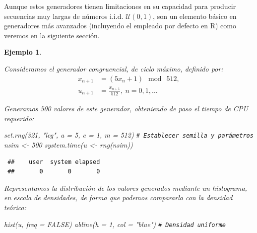 \documentclass[
  10pt,
]{book}
\newenvironment{Shaded}{\begin{snugshade}}{\end{snugshade}}
\newcommand{\AttributeTok}[1]{\textcolor[rgb]{0.77,0.63,0.00}{#1}}
\newcommand{\CommentTok}[1]{\textcolor[rgb]{0.56,0.35,0.01}{\textit{#1}}}
\newcommand{\ConstantTok}[1]{\textcolor[rgb]{0.00,0.00,0.00}{#1}}
\newcommand{\DecValTok}[1]{\textcolor[rgb]{0.00,0.00,0.81}{#1}}
\newcommand{\FunctionTok}[1]{\textcolor[rgb]{0.00,0.00,0.00}{#1}}
\newcommand{\NormalTok}[1]{#1}
\newcommand{\OtherTok}[1]{\textcolor[rgb]{0.56,0.35,0.01}{#1}}
\newcommand{\StringTok}[1]{\textcolor[rgb]{0.31,0.60,0.02}{#1}}
\theoremstyle{break}
\newtheorem{example}{Ejemplo}[chapter]
\theoremstyle{nonumberplain}
\renewcommand{\CommentTok}[1]{\textcolor[rgb]{0.41,0.41,0.41}{\texttt{#1}}}
\begin{document}
Aunque estos generadores tienen limitaciones en su capacidad para producir secuencias muy largas de números i.i.d. \(\mathcal{U}(0,1)\), son un elemento básico en generadores más avanzados (incluyendo el empleado por defecto en R) como veremos en la siguiente sección.

\begin{example}
\protect\hypertarget{exm:congru512}{}\label{exm:congru512}

Consideramos el generador congruencial, de ciclo máximo, definido por:
\[\begin{aligned}
x_{n+1}  & =(5x_{n}+1)\ \bmod\ 512,\nonumber\\
u_{n+1}  & =\frac{x_{n+1}}{512},\ n=0,1,\dots\nonumber
\end{aligned}\]

Generamos 500 valores de este generador, obteniendo de paso el tiempo de CPU requerido:

\begin{Shaded}
\begin{Highlighting}[]
\FunctionTok{set.rng}\NormalTok{(}\DecValTok{321}\NormalTok{, }\StringTok{"lcg"}\NormalTok{, }\AttributeTok{a =} \DecValTok{5}\NormalTok{, }\AttributeTok{c =} \DecValTok{1}\NormalTok{, }\AttributeTok{m =} \DecValTok{512}\NormalTok{)  }\CommentTok{\# Establecer semilla y parámetros}
\NormalTok{nsim }\OtherTok{\textless{}{-}} \DecValTok{500}
\FunctionTok{system.time}\NormalTok{(u }\OtherTok{\textless{}{-}} \FunctionTok{rng}\NormalTok{(nsim))}
\end{Highlighting}
\end{Shaded}

\begin{verbatim}
 ##    user  system elapsed 
 ##       0       0       0
\end{verbatim}

Representamos la distribución de los valores generados mediante un histograma, en escala de densidades, de forma que podemos compararla con la densidad teórica:

\begin{Shaded}
\begin{Highlighting}[]
\FunctionTok{hist}\NormalTok{(u, }\AttributeTok{freq =} \ConstantTok{FALSE}\NormalTok{)}
\FunctionTok{abline}\NormalTok{(}\AttributeTok{h =} \DecValTok{1}\NormalTok{, }\AttributeTok{col =} \StringTok{"blue"}\NormalTok{) }\CommentTok{\# Densidad uniforme}
\end{Highlighting}
\end{Shaded}


\end{example}
\end{document}
